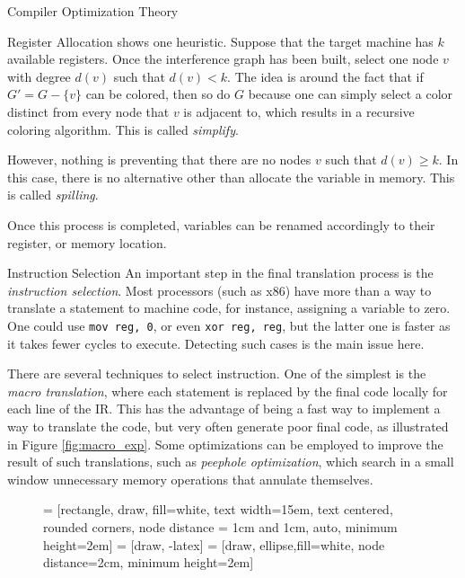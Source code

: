 \begin{section}{Compiler Optimization Theory}
\begin{subsection}{Register Allocation}
\cite{appel2004modern} shows one heuristic. Suppose that the target machine has
$k$ available registers. Once the interference graph has been built, select one
node $v$ with degree $d(v)$ such that $d(v) < k$. The idea is around the fact that
if $G' = G - \{v\}$ can be colored, then so do $G$ because one can simply select
a color distinct from every node that $v$ is adjacent to, which results in a 
recursive coloring algorithm. This is called \textit{simplify}.

However, nothing is preventing that there are no nodes $v$ such that
$d(v) \geq k$. In this case, there is no alternative other than allocate the
variable in memory. This is called \textit{spilling}.

Once this process is completed, variables can be renamed accordingly to their
register, or memory location.

\end{subsection}

\begin{subsection}{Instruction Selection}
An important step in the final translation process is the
\textit{instruction selection}. Most processors (such as x86) have more
than a way to translate a statement to machine code, for instance, 
assigning a variable to zero. One could use \texttt{mov reg, 0}, or
even \texttt{xor reg, reg}, but the latter one is faster as it takes fewer
cycles to execute. Detecting such cases is the main issue here.

There are several techniques to select instruction. One of the simplest
is the \textit{macro translation}, where each statement is replaced
by the final code locally for each line of the IR. This has the advantage
of being a fast way to implement a way to translate the code, but
very often generate poor final code, as illustrated in
Figure \ref{fig:macro_exp}. Some optimizations can be employed
to improve the result of such translations, such as
\textit{peephole optimization}, which search in a small window unnecessary memory operations that annulate themselves.

\begin{figure}
 = [rectangle, draw, fill=white,
    text width=15em, text centered, rounded corners, node distance = 1cm and 1cm, auto, minimum height=2em]
 = [draw, -latex]
 = [draw, ellipse,fill=white, node distance=2cm,
    minimum height=2em]

\begin{center}
\end{center}
\end{figure}
\end{subsection}
\end{section}
